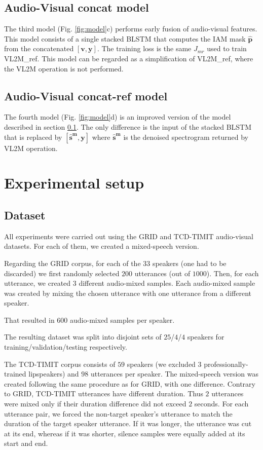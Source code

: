 \documentclass{article}
\begin{document}
\subsection{Audio-Visual concat model}
\label{ssub:concat_model}
The third model (Fig. \ref{fig:model}c) performs early fusion of audio-visual features. This model consists of a single stacked BLSTM that computes the IAM mask $\mathbf{\hat{p}}$ from the concatenated $[\mathbf{v},\mathbf{y}]$. The training loss is the same $J_{mr}$ used to train VL2M\_ref. This model can be regarded as a simplification of VL2M\_ref, where the VL2M operation is not performed.

\subsection{Audio-Visual concat-ref model}
\label{ssub:concat_ref_model}
The fourth model (Fig. \ref{fig:model}d) is an improved version of the model described in section \ref{ssub:concat_model}. The only difference is the input of the stacked BLSTM that is replaced by $[\mathbf{\hat{s}^m},\mathbf{y}]$ where $\mathbf{\hat{s}^m}$ is the denoised spectrogram returned by VL2M operation.

\section{Experimental setup}
\subsection{Dataset}
All experiments were carried out using the GRID \cite{cooke_audio-visual_2006} and TCD-TIMIT \cite{harte_tcd-timit:_2015} audio-visual datasets. For each of them, we created a mixed-speech version. 

Regarding the GRID corpus, for each of the $33$ speakers (one had to be discarded) we first randomly selected  $200$ utterances (out of $1000$). Then, for each utterance, we created $3$ different audio-mixed samples. Each audio-mixed sample was created by mixing the chosen utterance with one utterance from a different speaker. 

That resulted in $600$ audio-mixed samples per speaker.

The resulting dataset was split into disjoint sets of $25$/$4$/$4$ speakers for training/validation/testing respectively.

The TCD-TIMIT corpus consists of $59$ speakers (we excluded $3$ professionally-trained lipspeakers) and $98$ utterances per speaker. The mixed-speech version was created following the same procedure as for GRID, with one difference. 
Contrary to GRID, TCD-TIMIT utterances have different duration. Thus $2$ utterances were mixed only if their duration difference did not exceed $2$ seconds. 
For each utterance pair, we forced the non-target speaker's utterance to match the duration of the target speaker utterance. If it was longer, the utterance was cut at its end, whereas if it was shorter, silence samples were equally added at its start and end.
\end{document}

